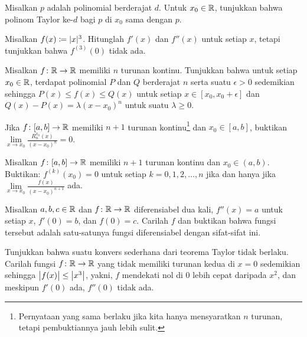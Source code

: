 \begin{exercise}
Misalkan $p$ adalah polinomial berderajat $d$.  Untuk $x_0 \in {\mathbb{R}}$,
tunjukkan bahwa
polinom Taylor ke-$d$ bagi $p$ di $x_0$ sama dengan $p$.
\end{exercise}

\begin{exercise}
Misalkan $f(x) \coloneqq \lvert {x} \rvert^3$.  Hitunglah $f'(x)$ dan $f''(x)$ untuk setiap $x$,
tetapi tunjukkan bahwa $f^{(3)}(0)$ tidak ada.
\end{exercise}

\begin{exercise}
Misalkan $f \colon {\mathbb{R}} \to {\mathbb{R}}$ memiliki $n$ turunan kontinu.  Tunjukkan
bahwa untuk setiap $x_0 \in {\mathbb{R}}$,
terdapat polinomial $P$ dan $Q$ berderajat $n$ serta 
suatu $\epsilon > 0$ sedemikian sehingga $P(x) \leq f(x) \leq Q(x)$ untuk setiap $x \in
[x_0,x_0+\epsilon]$  dan
$Q(x)-P(x) = \lambda {(x-x_0)}^n$ untuk suatu $\lambda \geq 0$.
\end{exercise}

\begin{exercise}
Jika $f \colon [a,b] \to {\mathbb{R}}$ memiliki $n+1$ turunan kontinu\footnote{%
Pernyataan yang sama berlaku jika kita hanya mensyaratkan $n$ turunan,
tetapi pembuktiannya jauh lebih sulit.
}
dan $x_0 \in [a,b]$,
buktikan
$\lim\limits_{x\to x_0} \frac{R_n^{x_0}(x)}{{(x-x_0)}^n} = 0$.
\end{exercise}

\begin{exercise}
Misalkan $f \colon [a,b] \to {\mathbb{R}}$ memiliki $n+1$ turunan kontinu
dan $x_0 \in (a,b)$.
Buktikan: $f^{(k)}(x_0) = 0$ untuk setiap $k = 0, 1, 2, \ldots, n$
jika dan hanya jika $\lim\limits_{x\to x_0} \frac{f(x)}{{(x-x_0)}^{n+1}}$ ada.
\end{exercise}

\begin{exercise}
Misalkan $a,b,c \in {\mathbb{R}}$ dan $f \colon {\mathbb{R}} \to {\mathbb{R}}$ diferensiabel dua kali,
$f''(x) = a$ untuk setiap $x$, $f'(0) = b$, dan $f(0) = c$.  Carilah $f$ dan buktikan bahwa 
fungsi tersebut adalah satu-satunya fungsi diferensiabel dengan sifat-sifat ini.
\end{exercise}

\begin{exercise}[Menantang]
Tunjukkan bahwa suatu konvers sederhana dari teorema Taylor tidak berlaku.
Carilah fungsi $f \colon {\mathbb{R}} \to {\mathbb{R}}$ yang tidak memiliki turunan kedua di $x=0$ sedemikian sehingga
$\bigl\lvert {f(x)} \bigr\rvert \leq \bigl\lvert {x^3} \bigr\rvert$, yakni, $f$ mendekati nol di 0 lebih cepat daripada $x^2$, dan
meskipun $f'(0)$ ada, $f''(0)$ tidak ada.
\end{exercise}

